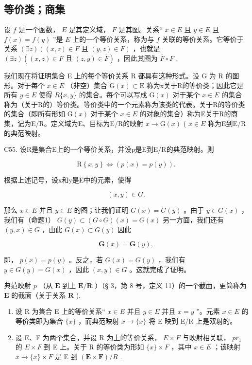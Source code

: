 \subsection{等价类；商集}

设 \(f\) 是一个函数， \(E\) 是其定义域， \(F\) 是其图。关系“ \(x \in E\) 且 \(y \in E\) 且 \(f(x) = f(y)\) ”是 \(E\) 上的一个等价关系，称为与 \(f\) 关联的等价关系。它等价于关系 \((\exists z)((x, z) \in F \text{ 且 } (y, z) \in F)\) ，也就是 \((\exists z)((x, z) \in F \text{ 且 } (z, y) \in \overline{F})\) ，因此其图为 \(\overline{F} \circ F\) .

我们现在将证明集合 E 上的每个等价关系 R 都具有这种形式。设 G 为 R 的图形。对于每个 \(x \in E\) （非空）集合 \(\mathrm{G}(x) \subset \mathrm{E}\) 称为x关于R的等价类；因此它是所有 \(y \in E\) 使得 \(R\{x, y\}\) 的集合。每个可以写成 \(\mathrm{G}(x)\) 对于某个 \(x \in E\) 的集合称为（关于R的）等价类。等价类中的一个元素称为该类的代表。关于R的等价类的集合（即所有形如 \(\mathrm{G}(x)\) 对于某个 \(x \in E\) 的对象的集合）称为E关于R的商集，记为E/R。定义域为E、目标为E/R的映射 \(x \to \mathrm{G}(x)\) ( \(x \in E\) 称为E到E/R的典范映射。

C55. 设R是集合E上的一个等价关系，并设p是E到E/R的典范映射。则

\[
\mathrm{R} \left\{x, y \right\} \Longleftrightarrow (p (x) = p (y)).
\]

根据上述记号，设x和y是E中的元素，使得

\[
(x, y) \in G.
\]

那么 \(x \in E\) 并且 \(y \in E\) 的图；让我们证明 \(G(x) = G(y)\) 。由于 \(y \in G(x)\) ，我们有（命题1） \(G(y) \subset (G \circ G)(x) = G(x)\) 另一方面，我们还有 \((y, x) \in G\) ，由此 \(G(x) \subset G(y)\) 因此

\[
\mathbf {G} (x) = \mathbf {G} (y),
\]

即， \(p(x) = p(y)\) 。反之，若 \(G(x) = G(y)\) ，我们有 \(y \in G(y) = G(x)\) ，因此 \((x, y) \in G\) 。这就完成了证明。

典范映射 \(p\) （从 \(\mathbf{E}\) 到上 \(\mathbf{E} / \mathbf{R}\) ）（§ 3，第 8 号，定义 11）的一个截面，更简称为 \(\mathbf{E}\) 的截面（关于关系 \(\mathbf{R}\) ).


\begin{enumerate}
\def\labelenumi{(\arabic{enumi})}
\item
  设 R 为集合 E 上的等价关系“ \(x \in E\) 并且 \(y \in E\) 并且 \(x = y\) ”。元素 \(x \in E\) 的等价类即为集合 \(\{x\}\) ，而典范映射 \(x \to \{x\}\) 将 E 映到 E/R 上是双射的。
\item
  设 E、F 为两个集合，并设 R 为上的等价关系， \(E \times F\) 与映射相关联， \(pr_{1}\) 的 \(E \times F\) 到 E 上。关于 R 的等价类为形如 \(\{x\} \times F\) ，其中 \(x \in E\) ；该映射 \(x \to \{x\} \times F\) 是 E 到 \((\mathbf{E} \times \mathbf{F}) / R\) .
\end{enumerate}

